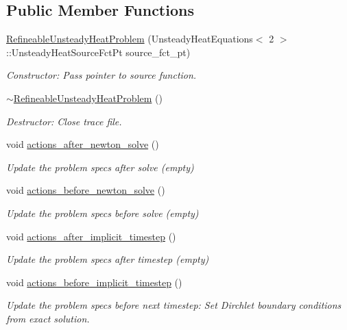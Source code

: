 \subsection*{Public Member Functions}
\begin{DoxyCompactItemize}
\item 
\hyperlink{classRefineableUnsteadyHeatProblem_a894f3bd6c1c23c307a736de6898e4e98}{Refineable\+Unsteady\+Heat\+Problem} (Unsteady\+Heat\+Equations$<$ 2 $>$\+::Unsteady\+Heat\+Source\+Fct\+Pt source\+\_\+fct\+\_\+pt)
\begin{DoxyCompactList}\small\item\em Constructor\+: Pass pointer to source function. \end{DoxyCompactList}\item 
\hyperlink{classRefineableUnsteadyHeatProblem_a975e00f5e87d77b4e1bf4d50482dea2b}{$\sim$\+Refineable\+Unsteady\+Heat\+Problem} ()
\begin{DoxyCompactList}\small\item\em Destructor\+: Close trace file. \end{DoxyCompactList}\item 
void \hyperlink{classRefineableUnsteadyHeatProblem_ada522772b79e92a75edf3724d0a273da}{actions\+\_\+after\+\_\+newton\+\_\+solve} ()
\begin{DoxyCompactList}\small\item\em Update the problem specs after solve (empty) \end{DoxyCompactList}\item 
void \hyperlink{classRefineableUnsteadyHeatProblem_aac1935e15c67b196e6db97dd058511b5}{actions\+\_\+before\+\_\+newton\+\_\+solve} ()
\begin{DoxyCompactList}\small\item\em Update the problem specs before solve (empty) \end{DoxyCompactList}\item 
void \hyperlink{classRefineableUnsteadyHeatProblem_aa740f2eb1b3909100a04709b401c0b41}{actions\+\_\+after\+\_\+implicit\+\_\+timestep} ()
\begin{DoxyCompactList}\small\item\em Update the problem specs after timestep (empty) \end{DoxyCompactList}\item 
void \hyperlink{classRefineableUnsteadyHeatProblem_ac754f1313cd6d684c149443beb5bcf9e}{actions\+\_\+before\+\_\+implicit\+\_\+timestep} ()
\begin{DoxyCompactList}\small\item\em Update the problem specs before next timestep\+: Set Dirchlet boundary conditions from exact solution. \end{DoxyCompactList}\item 

\end{DoxyCompactItemize}
